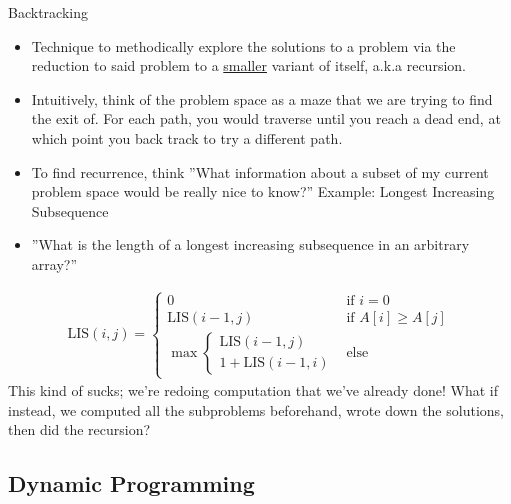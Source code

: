 \documentclass{beamer}
\begin{document}
\begin{frame}[t]{Backtracking}
    \begin{itemize}
        \item Technique to methodically explore the solutions to a problem via the reduction to said problem to a \underline{smaller} variant of itself, a.k.a \alert{recursion}. 
        \item Intuitively, think of the problem space as a maze that we are trying to find the exit of. For each path, you would traverse until you reach a dead end, at which point you \alert{back track} to try a different path.
        \item To find recurrence, think ''What information about a subset of my current problem space would be really nice to know?''
    \pause
    \alert{Example:} Longest Increasing Subsequence
        \item ''What is the length of a longest increasing subsequence in an arbitrary array?''
    \end{itemize}
    \pause
    \begin{align*}
        \text{LIS}(i, j) = \begin{cases}
        0 & \text{if } i = 0 \\
        \text{LIS}(i - 1, j) & \text{if } A[i] \geq A[j] \\
        \max \begin{cases}
            \text{LIS}(i -1, j) \\
            1 + \text{LIS}(i - 1, i)
        \end{cases} & \text{else}
    \end{cases}
    \end{align*}
    \pause
    This kind of sucks; we're redoing computation that we've already done! What if instead, we computed all the subproblems beforehand, wrote down the solutions, then did the recursion?
\end{frame}

\subsection{Dynamic Programming}
\end{document}
